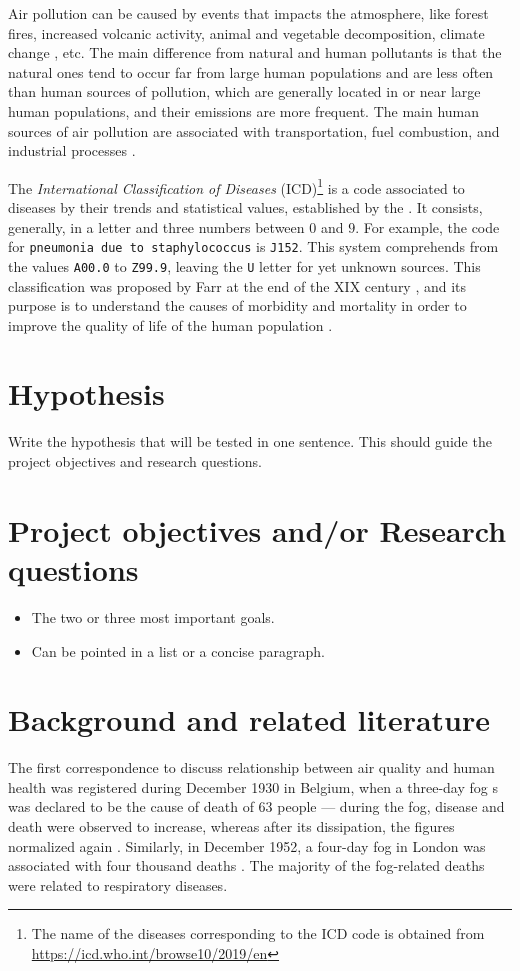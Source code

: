 \documentclass[
  11pt,
  a4paper,
  oneside
]{article}
\begin{document}
Air pollution can be caused by events that impacts the atmosphere, like forest fires, increased volcanic activity, animal and vegetable decomposition, climate change \citep{jacobEA2009}, etc. The main difference from natural and human pollutants is that the natural ones tend to occur far from large human populations and are less often than human sources of pollution, which are generally located in or near large human populations, and their emissions are more frequent. The main human sources of air pollution are associated with transportation, fuel combustion, and industrial processes \citep{fenger1999}.

The \emph{International Classification of Diseases} (ICD)\footnote{The name of the diseases corresponding to the ICD code is obtained from \url{https://icd.who.int/browse10/2019/en}} is a code associated to diseases by their trends and statistical values, established by the \citep{icd}. It consists, generally, in a letter and three numbers between $0$ and $9$. For example, the code for \texttt{pneumonia due to staphylococcus} is \texttt{J152}. This system comprehends from the values \texttt{A00.0} to \texttt{Z99.9}, leaving the \texttt{U} letter for yet unknown sources. This classification was proposed by Farr at the end of the XIX century \cite{who2011}, and its purpose is to understand the causes of morbidity and mortality in order to improve the quality of life of the human population \cite{who2011}.

\section{Hypothesis}
Write the hypothesis that will be tested in one sentence. This should guide the project objectives and research questions.

\section{Project objectives and/or Research questions}
\begin{itemize}
    \item The two or three most important goals.
    \item Can be pointed in a list or a concise paragraph.
\end{itemize}

\section{Background and related literature}
The first correspondence to discuss relationship between air quality and human health was registered during December 1930 in Belgium, when a three-day fog s was declared to be the cause of death of 63 people --- during the fog, disease and death were observed to increase, whereas after its dissipation, the  figures normalized again \citep{firket1936}. Similarly, in December 1952, a four-day fog in London was associated with four thousand deaths \citep{logan1953}. The majority of the fog-related deaths were related to respiratory diseases.
\end{document}

